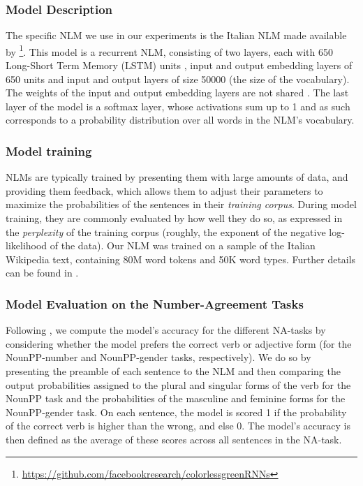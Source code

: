 \subsubsection{Model Description}
The specific NLM we use in our experiments is the Italian NLM made available by \citet{Gulordava:etal:2018}\footnote{\url{https://github.com/facebookresearch/colorlessgreenRNNs}}.
This model is a recurrent NLM, consisting of two layers, each with 650 Long-Short Term Memory (LSTM) units \citep{Hochreiter:Schmidhuber:1997}, input and output embedding layers of 650 units and input and output layers of size 50000 (the size of the vocabulary). 
The weights of the input and output embedding layers are not shared \citep{press2016using}.
The last layer of the model is a softmax layer, whose activations sum up to 1 and as such corresponds to a probability distribution over all words in the NLM's vocabulary. 

\subsubsection{Model training}
NLMs are typically trained by presenting them with large amounts of data, and providing them feedback, which allows them to adjust their parameters to maximize the probabilities of the sentences in their \emph{training corpus}.
During model training, they are commonly evaluated by how well they do so, as expressed in the \emph{perplexity} of the training corpus (roughly, the exponent of the negative log-likelihood of the data).
Our NLM was trained on a sample of the Italian Wikipedia text, containing 80M word tokens and 50K word types. Further details can be found in \citet{Gulordava:etal:2018}.


\subsubsection{Model Evaluation on the Number-Agreement Tasks}
Following \citet{Linzen:etal:2016}, we compute the model's accuracy for the different NA-tasks by considering whether the model prefers the correct verb or adjective form (for the NounPP-number and NounPP-gender tasks, respectively).
We do so by presenting the preamble of each sentence to the NLM and then comparing the output probabilities assigned to the plural and singular forms of the verb for the NounPP task and the probabilities of the masculine and feminine forms for the NounPP-gender task.
On each sentence, the model is scored 1 if the probability of the correct verb is higher than the wrong, and else 0. 
The model's accuracy is then defined as the average of these scores across all sentences in the NA-task. 

